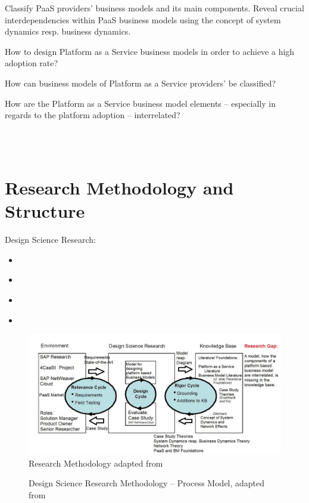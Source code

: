 Classify PaaS providers' business models and its main components. Reveal crucial interdependencies within PaaS business models using the concept of system dynamics resp. business dynamics.

\begin{MRQ}\label{mrq}
How to design Platform as a Service business models in order to achieve a high adoption rate?
\end{MRQ}

\begin{SRQ}\label{srq1}
How can business models of Platform as a Service providers' be classified?
\end{SRQ}

\begin{SRQ}\label{srq2}
How are the Platform as a Service business model elements -- especially in regards to the platform adoption -- interrelated?
\end{SRQ}

\\
\\
	
\section{Research Methodology and Structure}

Design Science Research:
\begin{itemize}
	\item \citet{March1995}
	\item \citet{Hevner2004}
	\item \citet{Hevner2007}
	\item \citet{Peffers2007}
\end{itemize}

\begin{figure}[htb]
	\centering
	\includegraphics[width=\textwidth]{gfx/researchMethodology}
	\caption[Research Methodology]{Research Methodology adapted from \citet{Hevner2007}}
	\label{fig:rm}
\end{figure}

\begin{figure}[tb]
	\centering
	
	\caption[Design Science Research Methodology -- Process Model]{Design Science Research Methodology -- Process Model, adapted from \citet{Peffers2007}}
	\label{fig:dsrm}
\end{figure}

